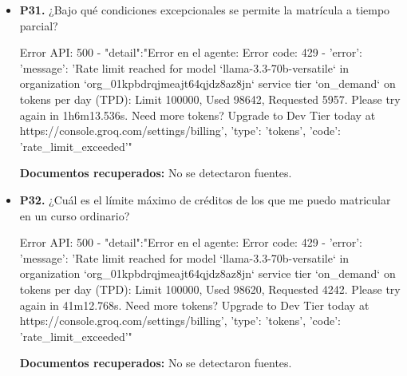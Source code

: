 \documentclass{article}
\begin{document}
\begin{itemize}
  \item \textbf{P31.} ¿Bajo qué condiciones excepcionales se permite la matrícula a tiempo parcial? \\
    \begin{respuesta_agente}
      Error API: 500 - {"detail":"Error en el agente: Error code: 429 - {'error': {'message': 'Rate limit reached for model `llama-3.3-70b-versatile` in organization `org_01kpbdrqjmeajt64qjdz8az8jn` service tier `on_demand` on tokens per day (TPD): Limit 100000, Used 98642, Requested 5957. Please try again in 1h6m13.536s. Need more tokens? Upgrade to Dev Tier today at https://console.groq.com/settings/billing', 'type': 'tokens', 'code': 'rate_limit_exceeded'}}"}
    \end{respuesta_agente}
    \vspace{0.2cm}
    \noindent\textbf{Documentos recuperados:} No se detectaron fuentes.

  \item \textbf{P32.} ¿Cuál es el límite máximo de créditos de los que me puedo matricular en un curso ordinario? \\
    \begin{respuesta_agente}
      Error API: 500 - {"detail":"Error en el agente: Error code: 429 - {'error': {'message': 'Rate limit reached for model `llama-3.3-70b-versatile` in organization `org_01kpbdrqjmeajt64qjdz8az8jn` service tier `on_demand` on tokens per day (TPD): Limit 100000, Used 98620, Requested 4242. Please try again in 41m12.768s. Need more tokens? Upgrade to Dev Tier today at https://console.groq.com/settings/billing', 'type': 'tokens', 'code': 'rate_limit_exceeded'}}"}
    \end{respuesta_agente}
    \vspace{0.2cm}
    \noindent\textbf{Documentos recuperados:} No se detectaron fuentes.

\end{itemize}
\end{document}
